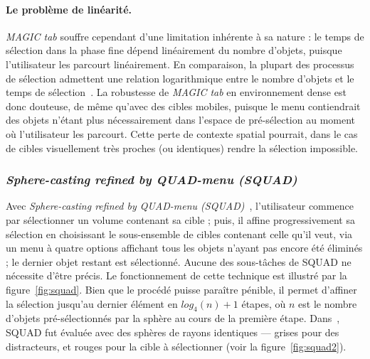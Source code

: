 	\paragraph{Le problème de linéarité.}
	\emph{MAGIC tab} souffre cependant d'une limitation inhérente à sa nature : le temps de sélection dans la phase fine dépend linéairement du nombre d'objets, puisque l'utilisateur les parcourt linéairement. En comparaison, la plupart des processus de sélection admettent une relation logarithmique entre le nombre d'objets et le temps de sélection~\cite{hick1952rate, hyman1953stimulus}. La robustesse de \emph{MAGIC tab} en environnement dense est donc douteuse, de même qu'avec des cibles mobiles, puisque le menu contiendrait des objets n'étant plus nécessairement dans l'espace de pré-sélection au moment où l'utilisateur les parcourt. Cette perte de contexte spatial pourrait, dans le cas de cibles visuellement très proches (ou identiques) rendre la sélection impossible.
	
	\subsubsection{\emph{Sphere-casting refined by QUAD-menu
(SQUAD)}}
	Avec \emph{Sphere-casting refined by QUAD-menu
(SQUAD)}~\cite{kopper2011rapid}, l'utilisateur commence par sélectionner un volume contenant sa cible ; puis, il affine progressivement sa sélection en choisissant le sous-ensemble de cibles contenant celle qu'il veut, via un menu à quatre options affichant tous les objets n'ayant pas encore été éliminés ; le dernier objet restant est sélectionné. Aucune des sous-tâches de SQUAD ne nécessite d'être précis. Le fonctionnement de cette technique est illustré par la figure~\ref{fig:squad}. Bien que le procédé puisse paraître pénible, il permet d'affiner la sélection jusqu'au dernier élément en $log_{4}(n)+1$ étapes, où $n$ est le nombre d'objets pré-sélectionnés par la sphère au cours de la première étape. Dans~\cite{kopper2011rapid}, SQUAD fut évaluée avec des sphères de rayons identiques --- grises pour des distracteurs, et rouges pour la cible à sélectionner (voir la figure~\ref{fig:squad2}).
	
